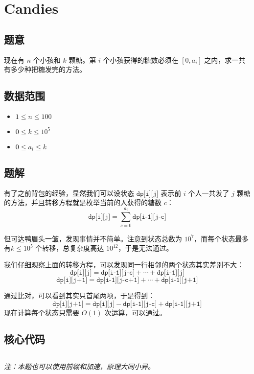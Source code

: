 \section{Candies}
\subsection*{题意}
现在有 $n$ 个小孩和 $k$ 颗糖。第 $i$ 个小孩获得的糖数必须在 $[0,a_i]$ 之内，求一共有多少种把糖发完的方法。

\subsection*{数据范围}
\begin{itemize}
\item $1 \leq n \leq 100$
\item $0 \leq k \leq 10^5$
\item $0 \leq a_i \leq k$
\end{itemize}


\subsection*{题解}

有了之前背包的经验，显然我们可以设状态 ${\texttt{dp[i][j]}}$ 表示前 $i$ 个人一共发了 $j$ 颗糖的方法，并且转移方程就是枚举当前的人获得的糖数 $c$：
$$
{\texttt{dp[i][j]}} = \sum_{c = 0}^{a_i} {\texttt{dp[i-1][j-c]}}
$$

但可达鸭眉头一皱，发现事情并不简单。注意到状态总数为 $10^7$，而每个状态最多有$k \le 10^5$ 个转移，总复杂度高达 $10^{12}$，于是无法通过。

我们仔细观察上面的转移方程，可以发现同一行相邻的两个状态其实差别不大：
$$
{\texttt{dp[i][j]}} = {\texttt{dp[i-1][j-c]}} + \cdots + {\texttt{dp[i-1][j]}}
$$
$$
{\texttt{dp[i][j+1]}} = {\texttt{dp[i-1][j-c+1]}} + \cdots + {\texttt{dp[i-1][j+1]}}
$$

通过比对，可以看到其实只首尾两项，于是得到：
$$
{\texttt{dp[i][j+1]}} = {\texttt{dp[i][j]}} - {\texttt{dp[i-1][j-c]}} + {\texttt{dp[i-1][j+1]}}
$$
现在计算每个状态只需要 $O(1)$ 次运算，可以通过。

\subsection*{核心代码}
\inputminted[linenos,autogobble]{cpp}{../Code/M.cpp}
\emph{注：本题也可以使用前缀和加速，原理大同小异。}

\newpage
